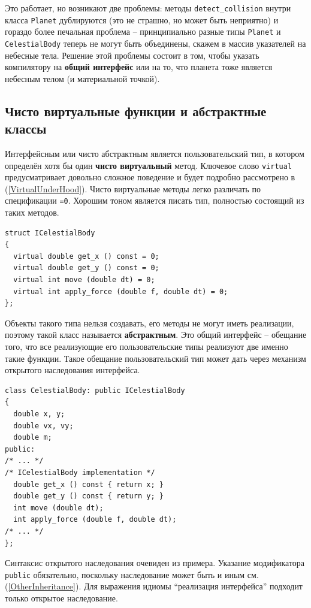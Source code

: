 \documentclass[a4paper,12pt,oneside]{book}
\begin{document}
Это работает, но возникают две проблемы: методы \lstinline!detect_collision! внутри класса \lstinline!Planet! дублируются (это не страшно, но может быть неприятно) и гораздо более печальная проблема -- принципиально разные типы \lstinline!Planet! и \lstinline!CelestialBody! теперь не могут быть объединены, скажем в массив указателей на небесные тела. Решение этой проблемы состоит в том, чтобы указать компилятору на \textbf{общий интерфейс} или на то, что планета тоже является небесным телом (и материальной точкой).

\subsection{Чисто виртуальные функции и абстрактные классы}\label{PureVirtual}

Интерфейсным или чисто абстрактным является пользовательский тип, в котором определён хотя бы один \textbf{чисто виртуальный} метод. Ключевое слово \lstinline!virtual! предусматривает довольно сложное поведение и будет подробно рассмотрено в (\ref{VirtualUnderHood}). Чисто виртуальные методы легко различать по спецификации \lstinline!=0!. Хорошим тоном является писать тип, полностью состоящий из таких методов.

\begin{lstlisting}
struct ICelestialBody
{
  virtual double get_x () const = 0;
  virtual double get_y () const = 0;
  virtual int move (double dt) = 0;
  virtual int apply_force (double f, double dt) = 0;
};
\end{lstlisting}

Объекты такого типа нельзя создавать, его методы не могут иметь реализации, поэтому такой класс называется \textbf{абстрактным}. Это общий интерфейс -- обещание того, что все реализующие его пользовательские типы реализуют две именно такие функции. Такое обещание пользовательский тип может дать через механизм открытого наследования интерфейса.

\begin{lstlisting}
class CelestialBody: public ICelestialBody
{
  double x, y;
  double vx, vy;
  double m;
public:
/* ... */
/* ICelestialBody implementation */
  double get_x () const { return x; }
  double get_y () const { return y; }
  int move (double dt); 
  int apply_force (double f, double dt);
/* ... */
};
\end{lstlisting}

Синтаксис открытого наследования очевиден из примера. Указание модификатора \lstinline!public! обязательно, поскольку наследование может быть и иным см. (\ref{OtherInheritance}). Для выражения идиомы ``реализация интерфейса'' подходит только открытое наследование. 
\end{document}
